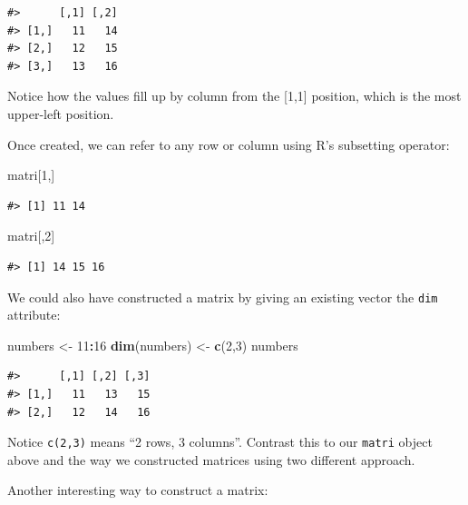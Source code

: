 \documentclass[]{article}
\newenvironment{Shaded}{\begin{snugshade}}{\end{snugshade}}
\newcommand{\DecValTok}[1]{\textcolor[rgb]{0.00,0.00,0.81}{#1}}
\newcommand{\KeywordTok}[1]{\textcolor[rgb]{0.13,0.29,0.53}{\textbf{#1}}}
\newcommand{\NormalTok}[1]{#1}
\newcommand{\OperatorTok}[1]{\textcolor[rgb]{0.81,0.36,0.00}{\textbf{#1}}}
\newcommand{\StringTok}[1]{\textcolor[rgb]{0.31,0.60,0.02}{#1}}
\begin{document}
\begin{verbatim}
#>      [,1] [,2]
#> [1,]   11   14
#> [2,]   12   15
#> [3,]   13   16
\end{verbatim}

Notice how the values fill up by column from the {[}1,1{]} position,
which is the most upper-left position.

Once created, we can refer to any row or column using R's subsetting
operator:

\begin{Shaded}
\begin{Highlighting}[]
\NormalTok{matri[}\DecValTok{1}\NormalTok{,]}
\end{Highlighting}
\end{Shaded}

\begin{verbatim}
#> [1] 11 14
\end{verbatim}

\begin{Shaded}
\begin{Highlighting}[]
\NormalTok{matri[,}\DecValTok{2}\NormalTok{]}
\end{Highlighting}
\end{Shaded}

\begin{verbatim}
#> [1] 14 15 16
\end{verbatim}

We could also have constructed a matrix by giving an existing vector the
\texttt{dim} attribute:

\begin{Shaded}
\begin{Highlighting}[]
\NormalTok{numbers <-}\StringTok{ }\DecValTok{11}\OperatorTok{:}\DecValTok{16}
\KeywordTok{dim}\NormalTok{(numbers) <-}\StringTok{ }\KeywordTok{c}\NormalTok{(}\DecValTok{2}\NormalTok{,}\DecValTok{3}\NormalTok{)}
\NormalTok{numbers}
\end{Highlighting}
\end{Shaded}

\begin{verbatim}
#>      [,1] [,2] [,3]
#> [1,]   11   13   15
#> [2,]   12   14   16
\end{verbatim}

Notice \texttt{c(2,3)} means ``2 rows, 3 columns''. Contrast this to our
\texttt{matri} object above and the way we constructed matrices using
two different approach.

Another interesting way to construct a matrix:
\end{document}
